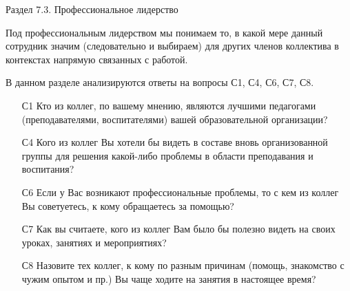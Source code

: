 \begin{frame}{Раздел 7.3. Профессиональное лидерство}

\tiny
Под профессиональным лидерством мы понимаем то, в какой мере данный сотрудник значим (следовательно и выбираем) для других членов коллектива в контекстах напрямую связанных с работой.
\bigskip

В данном разделе анализируются ответы на вопросы С1, С4, С6, С7, С8.
\bigskip

\begin{itemize}

\item [С1] Кто из коллег, по вашему мнению, являются лучшими педагогами (преподавателями, воспитателями) вашей образовательной организации?

\item [С4] Кого из коллег Вы хотели бы видеть в составе вновь организованной группы для решения какой-либо проблемы в области преподавания и воспитания?

\item [С6] Если у Вас возникают профессиональные проблемы, то с кем из коллег Вы советуетесь, к кому обращаетесь за помощью?

\item [С7] Как вы считаете, кого из коллег Вам было бы полезно видеть на своих уроках, занятиях и мероприятиях?

\item [С8] Назовите тех коллег, к кому по разным причинам (помощь, знакомство с чужим опытом и пр.) Вы чаще ходите на занятия в настоящее время?

\end{itemize}

\end{frame}


